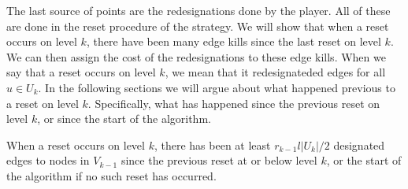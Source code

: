 The last source of points are the redesignations done by the player. All of these are done in the reset procedure of the strategy.
We will show that when a reset occurs on level $k$, there have been many edge kills since the last reset on level $k$. 
We can then assign the cost of the redesignations to these edge kills.
When we say that a reset occurs on level $k$, we mean that it redesignateded edges for all $u \in U_k$.
In the following sections we will argue about what happened previous to a reset on level $k$. Specifically, what has happened since the previous reset on level $k$, or since the start of the algorithm.
\begin{lemma}
\label{KRGame1}
When a reset occurs on level $k$, there has been at least $r_{k-1}l|U_k|/2$ designated edges to nodes in $V_{k-1}$ since the previous reset at or below level $k$, or the start of the algorithm if no such reset has occurred.
\end{lemma}
